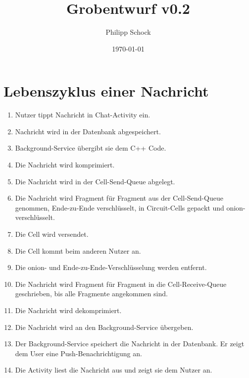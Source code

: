 \documentclass[a4paper]{article}
\title{Grobentwurf v0.2}
\author{Philipp Schock}
\date{\today}
\begin{document}
    \maketitle

    \section{Lebenszyklus einer Nachricht}
    \begin{enumerate}
        \item
            Nutzer tippt Nachricht in Chat-Activity ein.

        \item
            Nachricht wird in der Datenbank abgespeichert.

        \item
            Background-Service übergibt sie dem C++ Code.

        \item
            Die Nachricht wird komprimiert.

        \item
            Die Nachricht wird in der Cell-Send-Queue abgelegt.

        \item
            Die Nachricht wird Fragment für Fragment aus der Cell-Send-Queue genommen, Ende-zu-Ende verschlüsselt,
            in Circuit-Cells gepackt und onion-verschlüsselt.

        \item
            Die Cell wird versendet.

        \item
            Die Cell kommt beim anderen Nutzer an.

        \item
            Die onion- und Ende-zu-Ende-Verschlüsselung werden entfernt.

        \item
            Die Nachricht wird Fragment für Fragment in die Cell-Receive-Queue geschrieben, bis alle Fragmente angekommen sind.

        \item
            Die Nachricht wird dekomprimiert.
            
        \item
            Die Nachricht wird an den Background-Service übergeben.

        \item
            Der Background-Service speichert die Nachricht in der Datenbank.
            Er zeigt dem User eine Push-Benachrichtigung an.

        \item
            Die Activity liest die Nachricht aus und zeigt sie dem Nutzer an.
    \end{enumerate}
\end{document}
